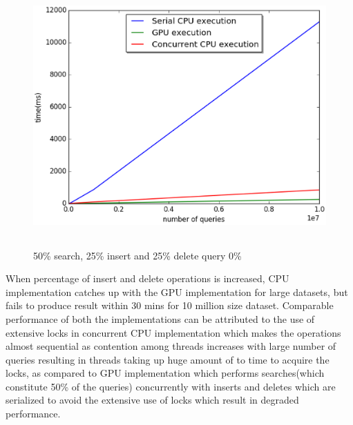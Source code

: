 \documentclass[MTech]{iitmdiss}
\begin{document}
\begin{figure}[H]
\centering 
\includegraphics[width=13cm,height=10cm]{s_i_d_50_25_25}
\caption{50\% search, 25\% insert and 25\% delete query 0\%}
\label{fig:sid_50_25_25}
\end{figure}
When percentage of insert and delete operations is increased, CPU implementation catches up with the GPU implementation for large datasets, but fails to produce result within 30 mins for 10 million size dataset. Comparable performance of both the implementations can be attributed to the use of extensive locks in concurrent CPU implementation which makes the operations almost sequential as contention among threads increases with large number of queries resulting in threads taking up huge amount of to time to acquire the locks, as compared to GPU implementation which performs searches(which constitute 50\% of the queries) concurrently with inserts and deletes which are serialized to avoid the extensive use of locks which result in degraded performance.       
\end{document}

